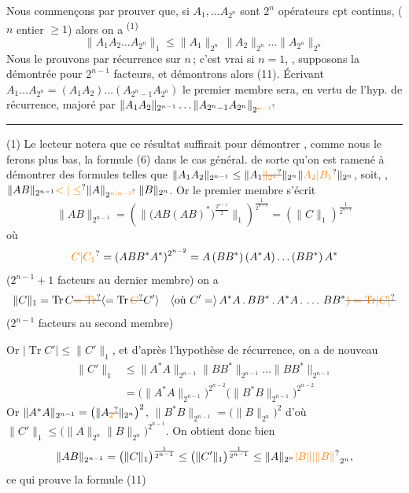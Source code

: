 Nous commençons par prouver que, si
$A_1,\ldots A_{2^n}$ sont $2^n$ opérateurs cpt continus,
($n$ entier $\geq1$) alors on a \textsuperscript{(1)}
\[
\|A_1 A_2\ldots A_{2^n}\|_1\leq\|A_1\|_{2^n}\,\|A_2\|_{2^n}\ldots\|A_{2^n}\|_{2^n}\tag*{(11)}
\]
Nous le prouvons par récurrence sur $n$\,;
c'est vrai si $n=1$,  , supposons
la  démontrée pour $2^{n-1}$ facteurs, et démontrons
alors (11). Écrivant $A_1\ldots A_{2^n}=(A_1A_2)\ldots(A_{2^n-1}A_{2^n})$
le premier membre sera, en vertu de l'hyp.
de récurrence, majoré par $\|A_1A_2\|_{2^{n-1}}\ldots\|A_{2^n-1}A_{2^n}\|_{2^{\unsure{n-1}}}$

\noindent\rule{\linewidth}{0.3pt}

(1) Le lecteur notera que ce résultat suffirait pour
démontrer  , comme nous le ferons plus bas,
la formule (6) dans le cas général.
de sorte qu'on est ramené à démontrer des formules telles que
$\|A_1 A_2\|_{2^{n-1}}\leq\|A_1\deleted{\unsure{\|_{2^2}}}\|_{2^n}\|\unsure{A_2|B_1}\|_{2^n}$, soit, ,
\uline{$\|AB\|_{2^{n-1}}\unsure{<|\leq}\|A\|_{2^{\unsure{n|n-1}}}\,\|B\|_{2^n}$}.
Or le premier membre s'écrit
\[
\|AB\|_{2^{n-1}}=\left(\bigl\|\bigl(AB(AB)^*\bigr)^{\frac{2^{n-1}}{2}}\bigr\|_1\right)^{\frac1{2^{n-1}}}
=\left(\|C\|_1\right)^{\frac1{2^{n-1}}}
\]
où
\[
\unsure{C|C_1}=(ABB^*A^*)^{2^{n-2}}=A\,(BB^*)\,(A^*A)\ldots(BB^*)\,A^*
\]
($2^{n-1}+1$ facteurs au dernier membre) on a
\[
\|C\|_1=\operatorname{Tr} C\deleted{\unsure{=\operatorname{Tr}}}\inserted{=\operatorname{Tr}\deleted{\unsure{C}}C'}\quad
\inserted{\text{où }C'=}\, A^*A\,.\,BB^*\,.\,A^*A\,.\,\ldots\,BB^*\deleted{\unsure{)=\operatorname{Tr}\lvert C\rvert}}
\]
($2^{n-1}$ facteurs au second membre)

Or $|\operatorname{Tr} C'|\leq\|C'\|_1$, et d'après l'hypothèse de récurrence, on a de nouveau
\[
\begin{aligned}
\|C'\|_1&\leq\|A^*A\|_{2^{n-1}}\|BB^*\|_{2^{n-1}}\ldots\|BB^*\|_{2^{n-1}}\\
&=\bigl(\|A^*A\|_{2^{n-1}}\bigr)^{2^{n-2}}\bigl(\|B^*B\|_{2^{n-1}}\bigr)^{2^{n-2}}
\end{aligned}
\]
Or $\|A^*A\|_{2^{n-1}}=\bigl(\|A\deleted{\unsure{_2}}\|_{2^n}\bigr)^2$,
$\|B^*B\|_{2^{n-1}}=\bigl(\|B\|_{2^n}\bigr)^2$
d'où $\|C'\|_1\leq\bigl(\|A\|_{2^n}\|B\|_{2^n}\bigr)^{2^{n-1}}$. On obtient donc bien
\[
\|AB\|_{2^{n-1}}=\bigl(\|C\|_1\bigr)^{\frac1{2^{n-1}}}
\leq\bigl(\|C'\|_1\bigr)^{\frac1{2^{n-1}}}\leq\|A\|_{2^n}\unsure{\lvert B\||\|B\|}_{2^n},
\]
ce qui prouve la formule (11)

